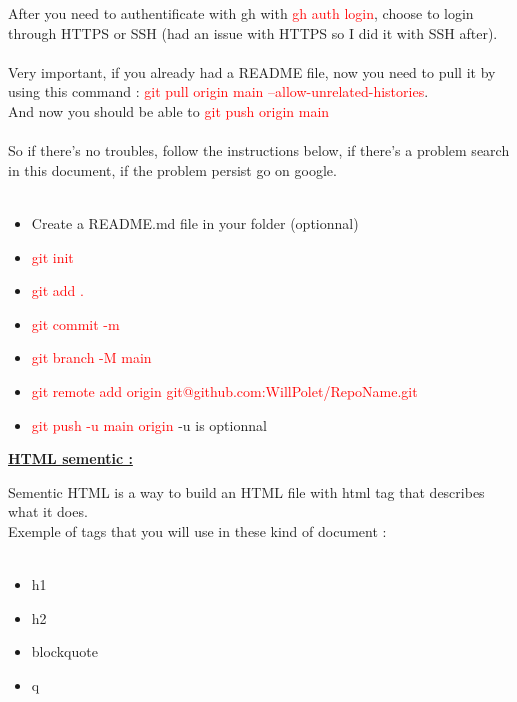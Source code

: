 \documentclass{article}
\begin{document}
After you need to authentificate with gh with \textcolor{red}{gh auth login}, choose to login through HTTPS or SSH (had an issue with HTTPS so I did it with SSH after). \\ \\
Very important, if you already had a README file, now you need to pull it by using this command : \textcolor{red}{git pull origin main --allow-unrelated-histories}. \\
And now you should be able to \textcolor{red}{git push origin main} \\ \\
So if there's no troubles, follow the instructions below, if there's a problem search in this document, if the problem persist go on google. \\ \\
\begin{itemize}
    \item Create a README.md file in your folder (optionnal)
    \item \textcolor{red}{git init}
    \item \textcolor{red}{git add .}
    \item \textcolor{red}{git commit -m}
    \item \textcolor{red}{git branch -M main}
    \item \textcolor{red}{git remote add origin git@github.com:WillPolet/RepoName.git}
    \item \textcolor{red}{git push -u main origin} -u is optionnal
\end{itemize}
\newpage
\begin{center}
    \LARGE{\bf \underline {HTML sementic :}} \\
\end{center}
Sementic HTML is a way to build an HTML file with html tag that describes what it does. \\
Exemple of tags that you will use in these kind of document : \\ \\
\begin{minipage}[c]{0.25\textwidth}
    \begin{itemize}[label = $\bullet$]
        \item h1
        \item h2
        \item blockquote
        \item q
    \end{itemize}
\end{minipage}
\end{document}
